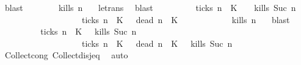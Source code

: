 \begin{isabellebody}
\ blast\isanewline
\ \ \ \ \ \ \isamarkupfalse%
\ {\isacartoucheopen}{\isacharquery}kills\ n\ {\isasymrho}{\isacartoucheclose}\ \isamarkupfalse%
\ le{\isacharunderscore}trans\ \isamarkupfalse%
\ blast\isanewline
\ \ \ \ \isacommand{{\isacharbraceright}}\isamarkupfalse%
\ \isamarkupfalse%
\ {\isacartoucheopen}{\isacharparenleft}{\isacharbraceleft}{\isasymrho}{\isachardot}\ {\isasymnot}\ {\isacharquery}ticks\ n\ {\isasymrho}\ K\ \ {\isasyminter}\ {\isacharbraceleft}{\isasymrho}{\isachardot}\ {\isacharquery}kills\ {\isacharparenleft}Suc\ n{\isacharparenright}\ {\isasymrho}{\isacharbraceright}{\isacharparenright}\isanewline
\ \ \ \ \ \ \ \ \ \ \ \ \ \ \ \ \ {\isasymunion}\ {\isacharparenleft}{\isacharbraceleft}{\isasymrho}{\isachardot}\ {\isacharquery}ticks\ n\ {\isasymrho}\ K\ {\isasyminter}\ {\isacharbraceleft}{\isasymrho}{\isachardot}\ {\isacharquery}dead\ n\ {\isasymrho}\ K\isanewline
\ \ \ \ \ \ \ \ \ \ {\isasymsubseteq}\ {\isacharbraceleft}{\isasymrho}{\isachardot}\ {\isacharquery}kills\ n\ {\isasymrho}{\isacharbraceright}{\isacartoucheclose}\ \isamarkupfalse%
\ blast\isanewline
\ \ \isamarkupfalse%
\isanewline
\ \ \isamarkupfalse%
\ \isamarkupfalse%
\ {\isacartoucheopen}{\isachardot}{\isachardot}{\isachardot}\ {\isacharequal}\ {\isacharbraceleft}{\isasymrho}{\isachardot}\ {\isasymnot}\ {\isacharquery}ticks\ n\ {\isasymrho}\ K\ {\isasyminter}\ {\isacharbraceleft}{\isasymrho}{\isachardot}\ {\isacharquery}kills\ {\isacharparenleft}Suc\ n{\isacharparenright}\ {\isasymrho}{\isacharbraceright}\isanewline
\ \ \ \ \ \ \ \ \ \ \ \ \ \ \ \ \ {\isasymunion}\ {\isacharbraceleft}{\isasymrho}{\isachardot}\ {\isacharquery}ticks\ n\ {\isasymrho}\ K\ {\isasyminter}\ {\isacharbraceleft}{\isasymrho}{\isachardot}\ {\isacharquery}dead\ n\ {\isasymrho}\ K\ {\isasyminter}\ {\isacharbraceleft}{\isasymrho}{\isachardot}\ {\isacharquery}kills\ {\isacharparenleft}Suc\ n{\isacharparenright}\ {\isasymrho}{\isacharbraceright}{\isacartoucheclose}\isanewline
\ \ \ \ \isamarkupfalse%
\ Collect{\isacharunderscore}cong\ Collect{\isacharunderscore}disj{\isacharunderscore}eq\ \isamarkupfalse%
\ auto\isanewline
\ \ \isamarkupfalse%

\end{isabellebody}
